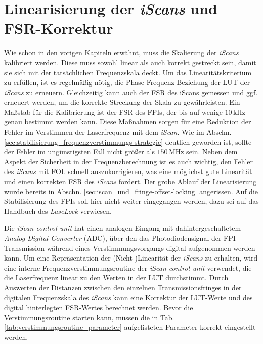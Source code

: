 \section{Linearisierung der \textit{iScans} und
FSR-Korrektur}\label{sec:linearisierung_iscan} Wie schon in den vorigen
Kapiteln erwähnt, muss die Skalierung der \textit{iScans} kalibriert werden.
Diese muss sowohl linear als auch korrekt gestreckt
sein, damit sie sich mit der tatsächlichen Frequenzskala deckt. Um das
Linearitätskriterium zu erfüllen, ist es regelmäßig nötig, die
Phase-Frequenz-Beziehung der LUT der \textit{iScans} zu erneuern. Gleichzeitig
kann auch der FSR des iScans gemessen und ggf. erneuert werden, um die korrekte
Streckung der Skala zu gewährleisten. Ein Maßstab für die Kalibrierung ist der
FSR des FPIs, der bis auf wenige $10\,$kHz genau bestimmt werden kann. Diese
Maßnahmen sorgen für eine Reduktion der Fehler im Verstimmen der Laserfrequenz
mit dem \textit{iScan}. Wie im Abschn.
\ref{sec:stabilisierung_frequenzverstimmungs-strategie} deutlich geworden ist,
sollte der Fehler im ungünstigsten Fall nicht größer als $150\,$MHz sein. Neben
dem Aspekt der Sicherheit in der Frequenzberechnung ist es auch wichtig, den
Fehler des \textit{iScans} mit FOL schnell auszukorrigieren, was eine möglichst
gute Linearität und einen korrekten FSR des \textit{iScans} fordert. Der grobe Ablauf
der Linearisierung wurde bereits in Abschn. \ref{sec:iscan_und_fringe-offset-locking} angerissen. Auf die Stabilisierung des FPIs soll hier nicht weiter eingegangen werden, dazu sei auf das Handbuch des \textit{LaseLock} \cite{laselock} verwiesen.\par
Die \textit{iScan control unit} hat einen analogen Eingang mit
dahintergeschaltetem \textit{Analog-Digital-Converter} (ADC), über den das
Photodiodensignal der FPI-Transmission während eines
Verstimmungsvorgangs digital aufgenommen werden kann. Um eine Repräsentation der
(Nicht-)Linearität der \textit{iScans} zu erhalten, wird eine interne
Frequenzverstimmungsroutine der \textit{iScan control unit} verwendet, die
die Laserfrequenz linear zu den Werten in der LUT durchstimmt.
Durch Auswerten der Distanzen zwischen den einzelnen
Transmissionsfringes in der digitalen Frequenzskala des \textit{iScans} kann
eine Korrektur der LUT-Werte und des digital hinterlegten FSR-Wertes berechnet
werden. Bevor die Verstimmungsroutine starten kann, müssen die in Tab.
\ref{tab:verstimmungsroutine_parameter} aufgelisteten Parameter korrekt
eingestellt werden.

